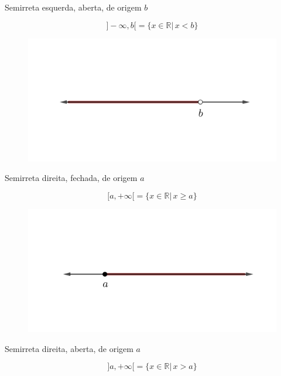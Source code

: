 \begin{itemize}
\begin{figure}[H]
\end{figure}

\begin{center}
	Semirreta esquerda, aberta, de origem $b$
\end{center}

$$]-\infty,b[ = \{x \in \mathbb{R}|\,  x < b \}$$
\begin{figure}[H]
	\centering
	
	\includegraphics[scale=3.5]{imagens/semi-b-esquerda-aberta.png}

\end{figure}
\begin{center}
	Semirreta direita, fechada, de origem $a$
\end{center}

$$[a,+\infty[ = \{x \in \mathbb{R}|\,  x \geq a \}$$
\begin{figure}[H]
	\centering
	
	\includegraphics[scale=3.5]{imagens/semi-a-direita-fechada.png}

\end{figure}
\begin{center}
	Semirreta direita, aberta, de origem $a$
\end{center}

$$]a,+\infty[ = \{x \in \mathbb{R}|\,  x > a \}$$
\begin{figure}[H]
	\centering
	

\end{figure}
\end{itemize}
